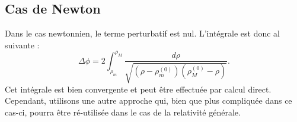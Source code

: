\documentclass[a4paper,11pt]{report}
\theoremstyle{definition}
\theoremstyle{plain}
\theoremstyle{definition}
\theoremstyle{remark}
\begin{document}
        \subsection{Cas de Newton}
        
            Dans le cas newtonnien, le terme perturbatif est nul. L'intégrale est donc al suivante :
            \begin{equation}
                \Delta\phi = 2\int^{\rho_M}_{\rho_m}\frac{d\rho}{\sqrt{\left( \rho-\rho^{(0)}_m \right)\left( \rho^{(0)}_M-\rho \right)}}.
            \end{equation}
            Cet intégrale est bien convergente et peut être effectuée par calcul direct. Cependant, utilisons une autre approche qui, bien que plus compliquée dans ce cas-ci, pourra être ré-utilisée dans le cas de la relativité générale.\\
            
\end{document}
